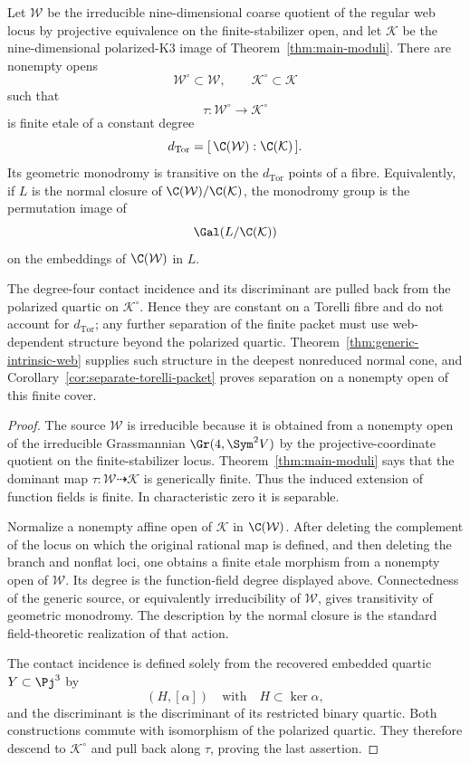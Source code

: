 \begin{theorem}
\label{thm:torelli-monodromy}
Let \(\mathcal W\) be the irreducible nine-dimensional coarse
quotient of the regular web locus by projective equivalence on the
finite-stabilizer open, and let \(\mathcal K\) be the
nine-dimensional polarized-K3 image of
Theorem~\ref{thm:main-moduli}.  There are nonempty opens
\[
 \mathcal W^\circ\subset\mathcal W,\qquad
 \mathcal K^\circ\subset\mathcal K
\]
such that
\[
 \tau:\mathcal W^\circ\longrightarrow\mathcal K^\circ
\]
is finite etale of a constant degree
\[
 d_{\mathrm{Tor}}
 =
 [\,\C(\mathcal W):\C(\mathcal K)\,].
\]
Its geometric monodromy is transitive on the \(d_{\mathrm{Tor}}\)
points of a fibre.  Equivalently, if \(L\) is the normal closure of
\(\C(\mathcal W)/\C(\mathcal K)\), the monodromy group is the
permutation image of
\[
 \Gal(L/\C(\mathcal K))
\]
on the embeddings of \(\C(\mathcal W)\) in \(L\).

The degree-four contact incidence and its discriminant are pulled back
from the polarized quartic on \(\mathcal K^\circ\).  Hence they are
constant on a Torelli fibre and do not account for
\(d_{\mathrm{Tor}}\); any further separation of the finite packet
must use web-dependent structure beyond the polarized quartic.
Theorem~\ref{thm:generic-intrinsic-web} supplies such structure in
the deepest nonreduced normal cone, and
Corollary~\ref{cor:separate-torelli-packet} proves separation on a
nonempty open of this finite cover.
\end{theorem}

\begin{proof}
The source \(\mathcal W\) is irreducible because it is obtained from a
nonempty open of the irreducible Grassmannian
\(\Gr(4,\Sym^2V)\) by the projective-coordinate quotient on the
finite-stabilizer locus.  Theorem~\ref{thm:main-moduli} says that the
dominant map \(\tau:\mathcal W\dashrightarrow\mathcal K\) is
generically finite.  Thus the induced extension of function fields is
finite.  In characteristic zero it is separable.

Normalize a nonempty affine open of \(\mathcal K\) in
\(\C(\mathcal W)\).  After deleting the complement of the locus on
which the original rational map is defined, and then deleting the
branch and nonflat loci, one obtains a finite etale morphism from a
nonempty open of \(\mathcal W\).  Its degree is the function-field
degree displayed above.  Connectedness of the generic source, or
equivalently irreducibility of \(\mathcal W\), gives transitivity of
geometric monodromy.  The description by the normal closure is the
standard field-theoretic realization of that action.

The contact incidence is defined solely from the recovered embedded
quartic \(Y\subset\Pj^3\) by
\[
 (H,[\alpha])\quad\text{with}\quad H\subset\ker\alpha,
\]
and the discriminant is the discriminant of its restricted binary
quartic.  Both constructions commute with isomorphism of the polarized
quartic.  They therefore descend to \(\mathcal K^\circ\) and pull
back along \(\tau\), proving the last assertion.
\end{proof}



